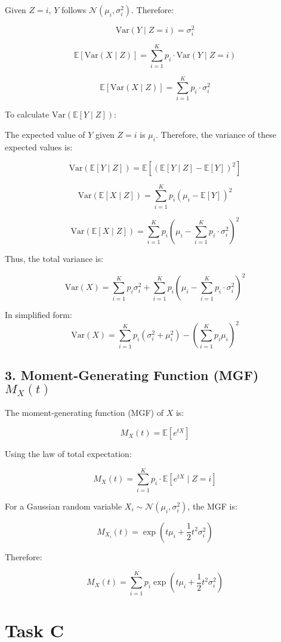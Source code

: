 \documentclass{article}
\begin{document}
Given \( Z = i \), \( Y \) follows \( \mathcal{N}(\mu_i, \sigma_i^2) \). Therefore:

\[
\text{Var}(Y \mid Z = i) = \sigma_i^2
\]

\[
\mathbb{E}[\text{Var}(X \mid Z)] = \sum_{i=1}^{K} p_i \cdot \text{Var}(Y \mid Z = i)
\]

\[
\mathbb{E}[\text{Var}(X \mid Z)] = \sum_{i=1}^{K} p_i \cdot \sigma_i^2
\]

To calculate \( \text{Var}(\mathbb{E}[Y \mid Z]) \):

The expected value of \( Y \) given \( Z = i \) is \( \mu_i \). Therefore, the variance of these expected values is:

\[
\text{Var}(\mathbb{E}[Y \mid Z]) = \mathbb{E}[(\mathbb{E}[Y \mid Z] - \mathbb{E}[Y])^2]
\]

\[
\text{Var}(\mathbb{E}[X \mid Z]) = \sum_{i=1}^{K} p_i (\mu_i - \mathbb{E}[Y])^2
\]

\[
\text{Var}(\mathbb{E}[X \mid Z]) = \sum_{i=1}^{K} p_i (\mu_i - \sum_{i=1}^{K} p_i \cdot \sigma_i^2)^2
\]

Thus, the total variance is:

\[
\text{Var}(X) = \sum_{i=1}^{K} p_i \sigma_i^2 + \sum_{i=1}^{K} p_i (\mu_i - \sum_{i=1}^{K} p_i \cdot \sigma_i^2)^2
\]

In simplified form:
\[
\text{Var}(X) =
\sum_{i=1}^K p_i (\sigma_i^2 + \mu_i^2) - \left( \sum_{i=1}^K p_i \mu_i \right)^2
\]

\subsection*{3. Moment-Generating Function (MGF) \( M_X(t) \)}

The moment-generating function (MGF) of \( X \) is:

\[
M_X(t) = \mathbb{E}[e^{tX}]
\]

Using the law of total expectation:

\[
M_X(t) = \sum_{i=1}^{K} p_i \cdot \mathbb{E}[e^{tX} \mid Z = i]
\]

For a Gaussian random variable \( X_i \sim \mathcal{N}(\mu_i, \sigma_i^2) \), the MGF is:

\[
M_{X_i}(t) = \exp\left(t\mu_i + \frac{1}{2}t^2\sigma_i^2\right)
\]

Therefore:

\[
M_X(t) = \sum_{i=1}^{K} p_i \exp\left(t\mu_i + \frac{1}{2}t^2\sigma_i^2\right)
\]

\section*{Task C}
\end{document}
